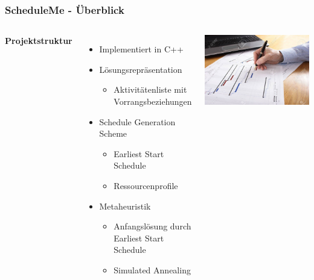 \documentclass[aspectratio=169]{beamer}
\begin{document}
\begin{frame}
	\frametitle{ScheduleMe - Überblick}
	\begin{columns}[c] %
		
		\textbf{Projektstruktur}
		\begin{itemize}
			\item Implementiert in C++
			\item Lösungsrepräsentation
			\begin{itemize}
				\item Aktivitätenliste mit Vorrangsbeziehungen
			\end{itemize} 
			\item Schedule Generation Scheme
			\begin{itemize}
				\item Earliest Start Schedule
				\item Ressourcenprofile
			\end{itemize}
			\item Metaheuristik
			\begin{itemize}
				\item Anfangslösung durch Earliest Start Schedule
				\item Simulated Annealing
			\end{itemize}
		\end{itemize}
		\includegraphics[scale=.5]{../images/stock.jpg}
	\end{columns}
\end{frame} 
  
\end{document}

